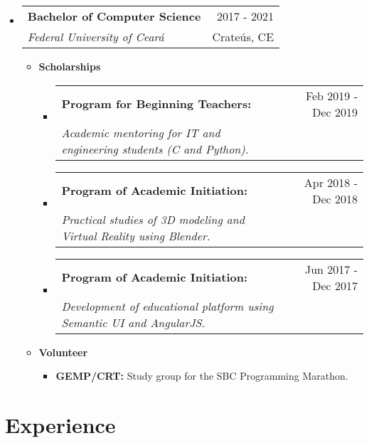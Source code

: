 \documentclass[letterpaper,11pt]{article}
\makeatletter
\newcommand{\resumeSubheading}[4]{
    \vspace{-1pt}\item
        \begin{tabular*}{0.97\textwidth}{l@{\extracolsep{\fill}}r}
            \textbf{#1} & #2 \\
            \textit{\small#3} & \small #4 \\
        \end{tabular*}
    \vspace{-5pt}
}
\newcommand{\resumeScholarship}[4]{
    \vspace{-1pt}\item
        \begin{tabular*}{0.89\textwidth}{l@{\extracolsep{\fill}}r}
            \textbf{\small#1} & #2 \\
            \textit{\small#3} & \small #4 \\
        \end{tabular*}\vspace{-5pt}
    \vspace{0.3cm}
}
\newcommand{\resumeSubHeadingListStart}{\begin{itemize}[leftmargin=*]}
\newcommand{\resumeSubHeadingListEnd}{\end{itemize}}
\makeatother
\begin{document}
    \resumeSubHeadingListStart
        \resumeSubheading
        {Bachelor of Computer Science}{\faCalendar \hspace{0.1cm} 2017 - 2021}
        {Federal University of Ceará}{\faMapMarker \hspace{0.1cm} Crateús, CE}
        \begin{itemize}
            \item \textbf{Scholarships}
                \begin{itemize}
                    \resumeScholarship
                    {Program for Beginning Teachers:}{\faCalendar \hspace{0.1cm} \small Feb 2019 - Dec 2019}
                    {Academic mentoring for IT and engineering students (C and Python).}{}
            
                    \resumeScholarship
                    {Program of Academic Initiation:}{\faCalendar \hspace{0.1cm} \small Apr 2018 - Dec 2018}
                    {Practical studies of 3D modeling and Virtual Reality using Blender.}{}
        
                    \resumeScholarship
                    {Program of Academic Initiation:}{\faCalendar \hspace{0.1cm} \small Jun 2017 - Dec 2017}
                    {Development of educational platform using Semantic UI and AngularJS.}{}
                \end{itemize}
        \end{itemize}
      
        \begin{itemize}
            \item \textbf{Volunteer}
                \begin{itemize}
                    \item \textbf{GEMP/CRT:} Study group for the SBC Programming Marathon. \href{https://github.com/GEMP-UFC-Crateus}{\scriptsize \faExternalLink}
                \end{itemize}
        \end{itemize}
        
    \resumeSubHeadingListEnd

\section{\faBriefcase \hspace{0.2cm} \Large Experience}
\end{document}
